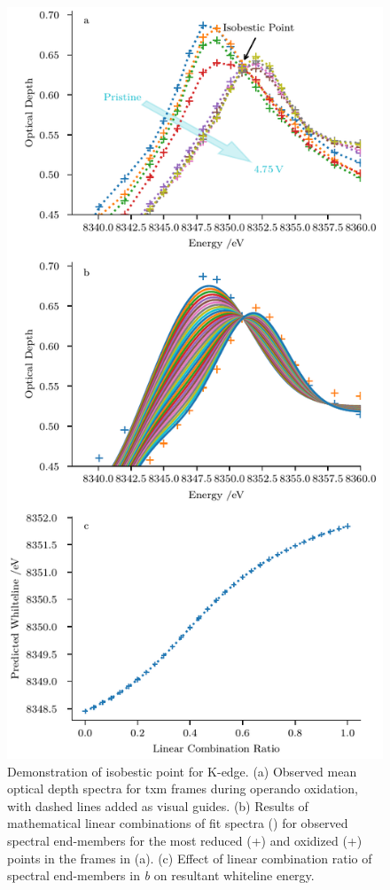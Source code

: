 \documentclass{article}
\begin{document}
\begin{figure}
  \begin{center}
    \includegraphics{figures/isobestic-point.pdf}
  \end{center}
  \caption{Demonstration of isobestic point for \nmc[333]{} 
    K-edge. (a) Observed mean optical depth spectra for \gls{txm}
    frames during operando oxidation, with dashed lines added as
    visual guides. (b) Results of mathematical linear combinations of
    fit spectra (\mplline{}) for observed spectral end-members for the
    most reduced (\textcolor{C0}{+}) and oxidized (\textcolor{C1}{+})
    points in the \nmc[333]{} frames in (a). (c) Effect of linear
    combination ratio of spectral end-members in \emph{b} on resultant
    whiteline energy.}
  \label{fig:isobestic-point}
\end{figure}
\end{document}

